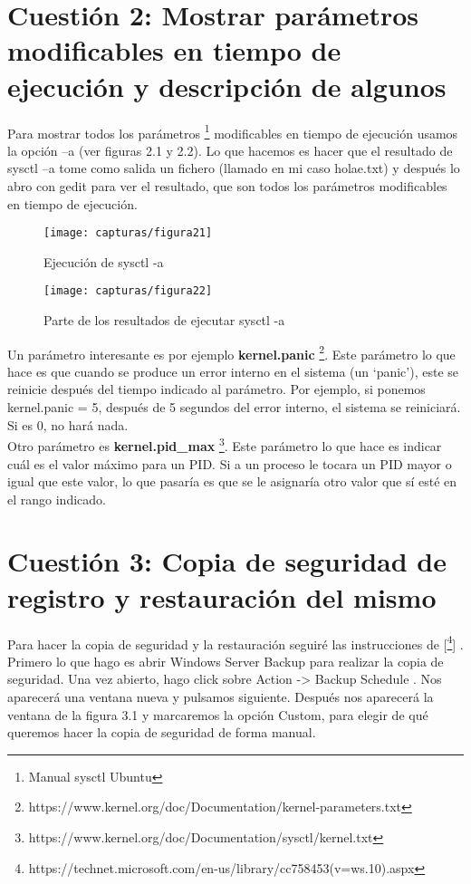 	\section{Cuestión 2: Mostrar parámetros modificables en tiempo de ejecución y descripción de algunos}
	Para mostrar todos los parámetros \footnote{Manual sysctl Ubuntu} modificables en tiempo de ejecución usamos la opción –a (ver figuras  2.1 y 2.2). Lo que hacemos es hacer que el resultado de sysctl –a tome como salida un fichero (llamado en mi caso holae.txt)  y después lo abro con gedit para ver el resultado, que son todos los parámetros modificables en tiempo de ejecución.
	
	\begin{figure} [H]
	\centering
	\texttt{[image: capturas/figura21]}
	\caption{Ejecución de sysctl -a}
	\label{fig:figura21}
	\end{figure}

	\begin{figure} [H]
	\centering
	\texttt{[image: capturas/figura22]}
	\caption{Parte de los resultados de ejecutar sysctl -a}
	\label{fig:figura22}
	\end{figure}
	
	Un parámetro interesante es por ejemplo \textbf{kernel.panic} \footnote{https://www.kernel.org/doc/Documentation/kernel-parameters.txt}. Este parámetro lo que hace es que cuando se produce un error interno en el sistema (un ‘panic’), este se reinicie después del tiempo indicado al parámetro. Por ejemplo, si ponemos kernel.panic = 5, después de 5 segundos del error interno, el sistema se reiniciará. Si es 0, no hará nada.
	\\
	
	Otro parámetro es \textbf{kernel.pid\_max} \footnote{https://www.kernel.org/doc/Documentation/sysctl/kernel.txt}. Este parámetro lo que hace es indicar cuál es el valor máximo para un PID. Si a un proceso le tocara un PID mayor o igual que este valor, lo que pasaría es que se le asignaría otro valor que sí esté en el rango indicado.
	
	\section{Cuestión 3: Copia de seguridad de registro y restauración del mismo}
	Para hacer la copia de seguridad y la restauración seguiré las instrucciones de [\footnote{https://technet.microsoft.com/en-us/library/cc758453(v=ws.10).aspx}] . Primero lo que hago es abrir Windows Server Backup para realizar la copia de seguridad. Una vez abierto, hago click sobre Action -> Backup Schedule . Nos aparecerá una ventana nueva y pulsamos siguiente. Después nos aparecerá la ventana de la figura 3.1 y marcaremos la opción Custom, para elegir de qué queremos hacer la copia de seguridad de forma manual.
	
